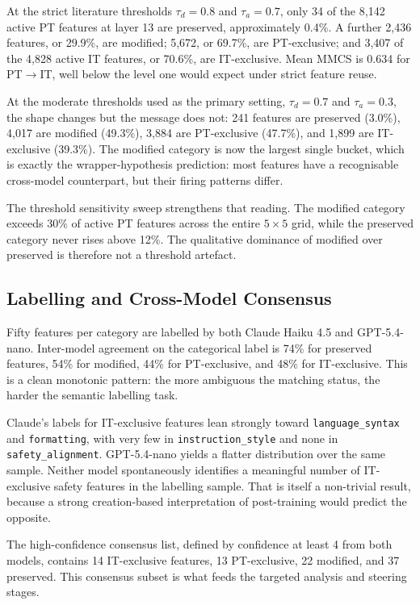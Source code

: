 At the strict literature thresholds $\tau_d = 0.8$ and $\tau_a = 0.7$, only 34 of the 8,142 active PT features at layer 13 are preserved, approximately 0.4\%. A further 2,436 features, or 29.9\%, are modified; 5,672, or 69.7\%, are PT-exclusive; and 3,407 of the 4,828 active IT features, or 70.6\%, are IT-exclusive. Mean MMCS is 0.634 for PT$\rightarrow$IT, well below the level one would expect under strict feature reuse.

At the moderate thresholds used as the primary setting, $\tau_d = 0.7$ and $\tau_a = 0.3$, the shape changes but the message does not: 241 features are preserved (3.0\%), 4,017 are modified (49.3\%), 3,884 are PT-exclusive (47.7\%), and 1,899 are IT-exclusive (39.3\%). The modified category is now the largest single bucket, which is exactly the wrapper-hypothesis prediction: most features have a recognisable cross-model counterpart, but their firing patterns differ.

The threshold sensitivity sweep strengthens that reading. The modified category exceeds 30\% of active PT features across the entire $5 \times 5$ grid, while the preserved category never rises above 12\%. The qualitative dominance of modified over preserved is therefore not a threshold artefact.

\subsection{Labelling and Cross-Model Consensus}
\label{subsec:labelling-results}

Fifty features per category are labelled by both Claude Haiku 4.5 and GPT-5.4-nano. Inter-model agreement on the categorical label is 74\% for preserved features, 54\% for modified, 44\% for PT-exclusive, and 48\% for IT-exclusive. This is a clean monotonic pattern: the more ambiguous the matching status, the harder the semantic labelling task.

Claude's labels for IT-exclusive features lean strongly toward \texttt{language\_syntax} and \texttt{formatting}, with very few in \texttt{instruction\_style} and none in \texttt{safety\_alignment}. GPT-5.4-nano yields a flatter distribution over the same sample. Neither model spontaneously identifies a meaningful number of IT-exclusive safety features in the labelling sample. That is itself a non-trivial result, because a strong creation-based interpretation of post-training would predict the opposite.

The high-confidence consensus list, defined by confidence at least 4 from both models, contains 14 IT-exclusive features, 13 PT-exclusive, 22 modified, and 37 preserved. This consensus subset is what feeds the targeted analysis and steering stages.

